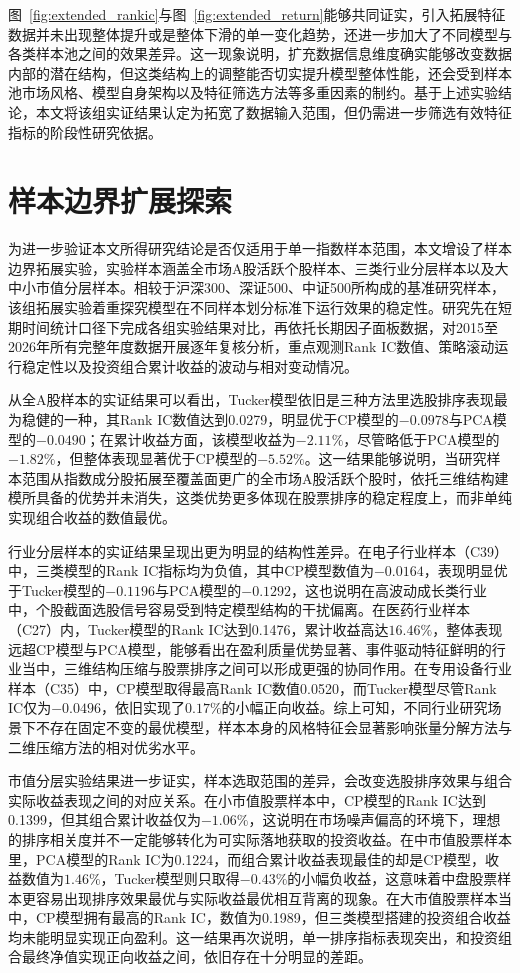 图~\ref{fig:extended_rankic}与图~\ref{fig:extended_return}能够共同证实，引入拓展特征数据并未出现整体提升或是整体下滑的单一变化趋势，还进一步加大了不同模型与各类样本池之间的效果差异。这一现象说明，扩充数据信息维度确实能够改变数据内部的潜在结构，但这类结构上的调整能否切实提升模型整体性能，还会受到样本池市场风格、模型自身架构以及特征筛选方法等多重因素的制约。基于上述实验结论，本文将该组实证结果认定为拓宽了数据输入范围，但仍需进一步筛选有效特征指标的阶段性研究依据。

\section{样本边界扩展探索}

为进一步验证本文所得研究结论是否仅适用于单一指数样本范围，本文增设了样本边界拓展实验，实验样本涵盖全市场A股活跃个股样本、三类行业分层样本以及大中小市值分层样本。相较于沪深300、深证500、中证500所构成的基准研究样本，该组拓展实验着重探究模型在不同样本划分标准下运行效果的稳定性。研究先在短期时间统计口径下完成各组实验结果对比，再依托长期因子面板数据，对2015至2026年所有完整年度数据开展逐年复核分析，重点观测Rank IC数值、策略滚动运行稳定性以及投资组合累计收益的波动与相对变动情况。

从全A股样本的实证结果可以看出，Tucker模型依旧是三种方法里选股排序表现最为稳健的一种，其Rank IC数值达到0.0279，明显优于CP模型的$-0.0978$与PCA模型的$-0.0490$；在累计收益方面，该模型收益为$-2.11\%$，尽管略低于PCA模型的$-1.82\%$，但整体表现显著优于CP模型的$-5.52\%$。这一结果能够说明，当研究样本范围从指数成分股拓展至覆盖面更广的全市场A股活跃个股时，依托三维结构建模所具备的优势并未消失，这类优势更多体现在股票排序的稳定程度上，而非单纯实现组合收益的数值最优。

行业分层样本的实证结果呈现出更为明显的结构性差异。在电子行业样本（C39）中，三类模型的Rank IC指标均为负值，其中CP模型数值为$-0.0164$，表现明显优于Tucker模型的$-0.1196$与PCA模型的$-0.1292$，这也说明在高波动成长类行业中，个股截面选股信号容易受到特定模型结构的干扰偏离。在医药行业样本（C27）内，Tucker模型的Rank IC达到0.1476，累计收益高达$16.46\%$，整体表现远超CP模型与PCA模型，能够看出在盈利质量优势显著、事件驱动特征鲜明的行业当中，三维结构压缩与股票排序之间可以形成更强的协同作用。在专用设备行业样本（C35）中，CP模型取得最高Rank IC数值0.0520，而Tucker模型尽管Rank IC仅为$-0.0496$，依旧实现了$0.17\%$的小幅正向收益。综上可知，不同行业研究场景下不存在固定不变的最优模型，样本本身的风格特征会显著影响张量分解方法与二维压缩方法的相对优劣水平。

市值分层实验结果进一步证实，样本选取范围的差异，会改变选股排序效果与组合实际收益表现之间的对应关系。在小市值股票样本中，CP模型的Rank IC达到0.1399，但其组合累计收益仅为$-1.06\%$，这说明在市场噪声偏高的环境下，理想的排序相关度并不一定能够转化为可实际落地获取的投资收益。在中市值股票样本里，PCA模型的Rank IC为0.1224，而组合累计收益表现最佳的却是CP模型，收益数值为$1.46\%$，Tucker模型则只取得$-0.43\%$的小幅负收益，这意味着中盘股票样本更容易出现排序效果最优与实际收益最优相互背离的现象。在大市值股票样本当中，CP模型拥有最高的Rank IC，数值为0.1989，但三类模型搭建的投资组合收益均未能明显实现正向盈利。这一结果再次说明，单一排序指标表现突出，和投资组合最终净值实现正向收益之间，依旧存在十分明显的差距。

